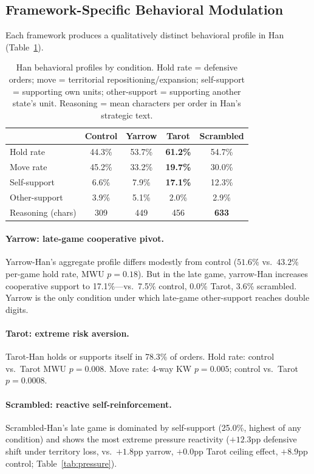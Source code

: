 \documentclass[11pt]{article}
\begin{document}
\subsection{Framework-Specific Behavioral Modulation}
\label{sec:behavioral}

Each framework produces a qualitatively distinct behavioral profile in Han (Table~\ref{tab:behavior}).

\begin{table}[t]
\centering
\caption{Han behavioral profiles by condition. Hold rate = defensive orders; move = territorial repositioning/expansion; self-support = supporting own units; other-support = supporting another state's unit. Reasoning = mean characters per order in Han's strategic text.}
\label{tab:behavior}
\begin{tabular}{lcccc}
\toprule
& Control & Yarrow & Tarot & Scrambled \\
\midrule
Hold rate & 44.3\% & 53.7\% & \textbf{61.2\%} & 54.7\% \\
Move rate & 45.2\% & 33.2\% & \textbf{19.7\%} & 30.0\% \\
Self-support & 6.6\% & 7.9\% & \textbf{17.1\%} & 12.3\% \\
Other-support & 3.9\% & 5.1\% & 2.0\% & 2.9\% \\
Reasoning (chars) & 309 & 449 & 456 & \textbf{633} \\
\bottomrule
\end{tabular}
\end{table}

\paragraph{Yarrow: late-game cooperative pivot.} Yarrow-Han's aggregate profile differs modestly from control ($51.6\%$ vs.\ $43.2\%$ per-game hold rate, MWU $p = 0.18$). But in the late game, yarrow-Han increases cooperative support to 17.1\%---vs.\ 7.5\% control, 0.0\% Tarot, 3.6\% scrambled. Yarrow is the only condition under which late-game other-support reaches double digits.

\paragraph{Tarot: extreme risk aversion.} Tarot-Han holds or supports itself in 78.3\% of orders. Hold rate: control vs.\ Tarot MWU $p = 0.008$. Move rate: 4-way KW $p = 0.005$; control vs.\ Tarot $p = 0.0008$.

\paragraph{Scrambled: reactive self-reinforcement.} Scrambled-Han's late game is dominated by self-support (25.0\%, highest of any condition) and shows the most extreme pressure reactivity ($+12.3$pp defensive shift under territory loss, vs.\ $+1.8$pp yarrow, $+0.0$pp Tarot ceiling effect, $+8.9$pp control; Table~\ref{tab:pressure}).
\end{document}
